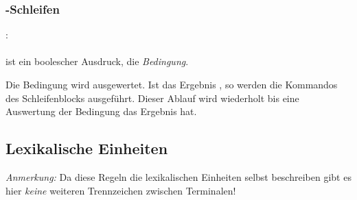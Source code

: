 
\subsubsection{-Schleifen}\label{$_backslash$kw__while__-Schleifen}
:\label{schleife_while}\\
\hspace*{1cm}\Gspace\Gt{(}\Gspace{} \Gspace\Gt{)}\Gspace\Gt{\{}\Gspace{} \Gspace\Gt{\}}\\

\glq{}\grq ist ein boolescher Ausdruck, die \emph{Bedingung}.

Die Bedingung wird ausgewertet. Ist das Ergebnis , so werden die Kommandos des Schleifenblocks
ausgeführt. Dieser Ablauf wird wiederholt bis eine Auswertung der Bedingung das Ergebnis  hat.


\subsection{Lexikalische Einheiten}\label{Lexikalische Einheiten}

\emph{Anmerkung:} Da diese Regeln die lexikalischen Einheiten selbst beschreiben gibt es
hier \emph{keine} weiteren Trennzeichen zwischen Terminalen!


